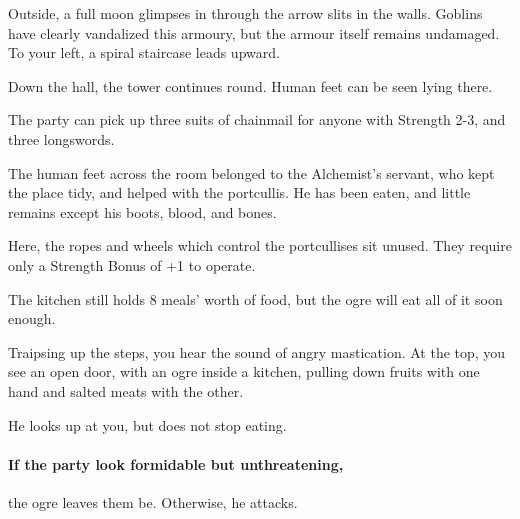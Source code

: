 \begin{multicols}{2}
\begin{boxtext}

  Outside, a full moon glimpses in through the arrow slits in the walls.
  Goblins have clearly vandalized this armoury, but the armour itself remains undamaged.
  To your left, a spiral staircase leads upward.

  Down the hall, the tower continues round.
  Human feet can be seen lying there.

\end{boxtext}


The party can pick up three suits of chainmail for anyone with Strength 2-3, and three longswords.

The human feet across the room belonged to the Alchemist's servant, who kept the place tidy, and helped with the portcullis.
He has been eaten, and little remains except his boots, blood, and bones.


Here, the ropes and wheels which control the portcullises sit unused.
They require only a Strength Bonus of +1 to operate.


The kitchen still holds 8 meals' worth of food, but the ogre will eat all of it soon enough.

\begin{boxtext}

  Traipsing up the steps, you hear the sound of angry mastication.
  At the top, you see an open door, with an ogre inside a kitchen, pulling down fruits with one hand and salted meats with the other.

  He looks up at you, but does not stop eating.

\end{boxtext}

\paragraph{If the party look formidable but unthreatening,}
the ogre leaves them be.
Otherwise, he attacks.




\end{multicols}
